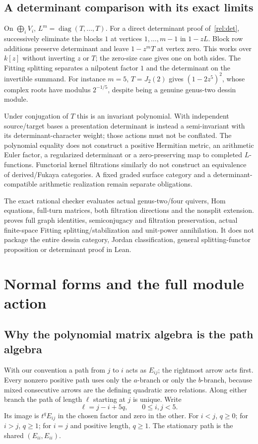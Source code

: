 \documentclass[11pt]{article}
\theoremstyle{definition}\newtheorem{definition}[theorem]{Definition}
\theoremstyle{remark}\newtheorem{remark}[theorem]{Remark}
\begin{document}
\subsection{A determinant comparison with its exact limits}
On $\bigoplus_iV_i$, $L^m=\operatorname{diag}(T,\ldots,T)$.
For a direct determinant proof of~\eqref{rel:det}, successively eliminate
the blocks $1$ at vertices $1,\ldots,m-1$ in $1-zL$.
Block row additions preserve determinant and leave $1-z^mT$ at vertex
zero. This works over $k[z]$ without inverting $z$ or $T$; the zero-size
case gives one on both sides. The Fitting splitting separates a nilpotent
factor $1$ and the determinant on the invertible summand. For instance
$m=5$, $T=J_2(2)$ gives $(1-2z^5)^2$, whose complex roots have modulus
$2^{-1/5}$, despite being a genuine genus-two dessin module.

Under conjugation of $T$ this is an invariant polynomial. With independent
source/target bases a presentation determinant is instead a semi-invariant
with its determinant-character weight; those actions must not be conflated.
The polynomial equality does not construct a positive Hermitian metric,
an arithmetic Euler factor, a regularized determinant or a zero-preserving
map to completed $L$-functions. Functorial kernel filtrations similarly do
not construct an equivalence of derived/Fukaya categories. A fixed graded
surface category and a determinant-compatible arithmetic realization remain
separate obligations.

The exact rational checker evaluates actual genus-two/four quivers, Hom
equations, full-turn matrices, both filtration directions and the nonsplit
extension.  proves full graph
identities, semiconjugacy and filtration preservation, actual finite-space
Fitting splitting/stabilization and unit-power annihilation. It does not
package the entire dessin category, Jordan classification, general
splitting-functor proposition or determinant proof in Lean.

\section{Normal forms and the full module action}\label{bre:details}
\subsection{Why the polynomial matrix algebra is the path algebra}
With our convention a path from $j$ to $i$ acts as $E_{ij}$; the
rightmost arrow acts first. Every nonzero positive path uses only the
$a$-branch or only the $b$-branch, because mixed consecutive arrows
are the defining quadratic zero relations. Along either branch the path
of length $\ell$ starting at $j$ is unique. Write
\[
 \ell=j-i+5q,\qquad 0\leq i,j<5.
\]
Its image is $t^qE_{ij}$ in the chosen factor and zero in the other.
For $i<j$, $q\geq0$; for $i>j$, $q\geq1$; for $i=j$ and
positive length, $q\geq1$. The stationary path is the shared
$(E_{ii},E_{ii})$.
\end{document}
